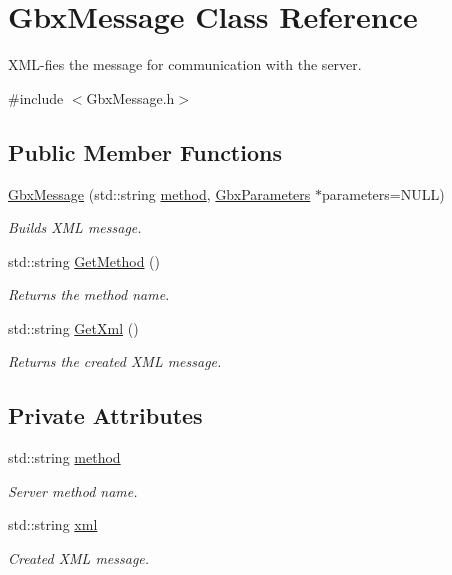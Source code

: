 \hypertarget{classGbxMessage}{\section{Gbx\-Message Class Reference}
\label{classGbxMessage}
}


X\-M\-L-\/fies the message for communication with the server.  




{\ttfamily \#include $<$Gbx\-Message.\-h$>$}

\subsection*{Public Member Functions}
\begin{DoxyCompactItemize}
\item 
\hyperlink{classGbxMessage_ad4a5e5f75787e12229cf03aabc4ad930}{Gbx\-Message} (std\-::string \hyperlink{classGbxMessage_a10b6118916999db98f28e3f495eef6b4}{method}, \hyperlink{classGbxParameters}{Gbx\-Parameters} $\ast$parameters=N\-U\-L\-L)
\begin{DoxyCompactList}\small\item\em Builds X\-M\-L message. \end{DoxyCompactList}\item 
std\-::string \hyperlink{classGbxMessage_a53e00a162c293251bef476ad74d0134c}{Get\-Method} ()
\begin{DoxyCompactList}\small\item\em Returns the method name. \end{DoxyCompactList}\item 
std\-::string \hyperlink{classGbxMessage_ac81e16efce7da483a696d6653e18c9d8}{Get\-Xml} ()
\begin{DoxyCompactList}\small\item\em Returns the created X\-M\-L message. \end{DoxyCompactList}\end{DoxyCompactItemize}
\subsection*{Private Attributes}
\begin{DoxyCompactItemize}
\item 
std\-::string \hyperlink{classGbxMessage_a10b6118916999db98f28e3f495eef6b4}{method}
\begin{DoxyCompactList}\small\item\em Server method name. \end{DoxyCompactList}\item 
std\-::string \hyperlink{classGbxMessage_a6ea9adbeb3f1c104fa08fce0b1a4090d}{xml}
\begin{DoxyCompactList}\small\item\em Created X\-M\-L message. \end{DoxyCompactList}\end{DoxyCompactItemize}



